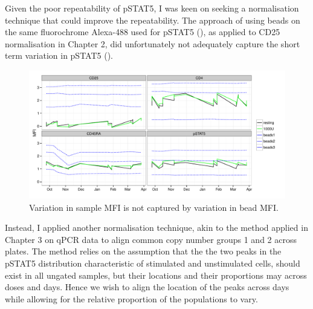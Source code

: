 Given the poor repeatability of pSTAT5, I was keen on seeking a normalisation technique that could improve the repeatability.
The approach of using beads on the same fluorochrome Alexa-488 used for pSTAT5 (),
as applied to CD25 normalisation in Chapter 2, 
did unfortunately not adequately capture the short term variation in pSTAT5 ().

\begin{figure}[h]
    \centering
    \includegraphics[scale=.5]{IL2/figures/beads.pdf}
    {Variation in sample MFI is not captured by variation in bead MFI.}
    { }
\end{figure}

Instead, I applied another normalisation technique, akin to the method applied in Chapter 3 on qPCR data to align common copy number groups 1 and 2 across plates.
The method relies on the assumption that the the two peaks in the pSTAT5 distribution characteristic of stimulated and unstimulated cells,
should exist in all ungated samples, but their locations and their proportions may across doses and days.
Hence we wish to align the location of the peaks across days while allowing for the relative proportion of the populations to vary.  


